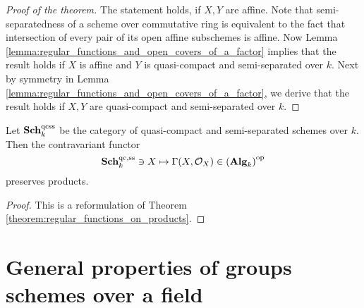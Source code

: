 \begin{proof}[Proof of the theorem]
The statement holds, if $X,Y$ are affine. Note that semi-separatedness of a scheme over commutative ring is equivalent to the fact that intersection of every pair of its open affine subschemes is affine. Now Lemma \ref{lemma:regular_functions_and_open_covers_of_a_factor} implies that the result holds if $X$ is affine and $Y$ is quasi-compact and semi-separated over $k$. Next by symmetry in Lemma \ref{lemma:regular_functions_and_open_covers_of_a_factor}, we derive that the result holds if $X,Y$ are quasi-compact and semi-separated over $k$.
\end{proof}

\begin{corollary}\label{corollary:functorial_reformulation_of_regular_functions_on_products}
Let $\mathbf{Sch}_k^{\mathrm{qcss}}$ be the category of quasi-compact and semi-separated schemes over $k$. Then the contravariant functor
$$\mathbf{Sch}_k^{\mathrm{qc},\mathrm{ss}}\ni X \mapsto \Gamma(X,{\mathcal O}_X)\in \left(\mathbf{Alg}_k\right)^{\mathrm{op}}$$
preserves products.
\end{corollary}
\begin{proof}
This is a reformulation of Theorem \ref{theorem:regular_functions_on_products}.
\end{proof}

\section{General properties of groups schemes over a field}

